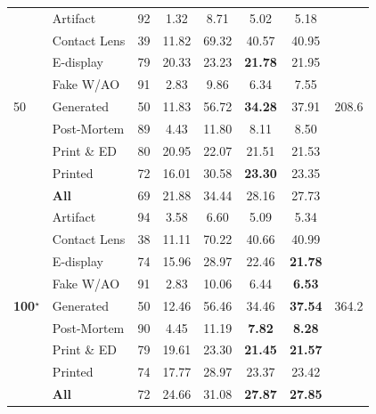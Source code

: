 \documentclass{article}
\newcommand{\B}[1]{\textbf{#1}}
\begin{document}
\begin{table}[!htbp]
\begin{tabular}{l l c c c c c c}
\multirow{9}{*}{50}
& Artifact          & 92 &   1.32 &  8.71 &           5.02 &  5.18 & \multirow{9}{*}{208.6} \\
& Contact Lens      & 39 &  11.82 & 69.32 &          40.57 & 40.95 & \\
& E-display         & 79 &  20.33 & 23.23 & \B{21.78} & 21.95 & \\
& Fake W/AO         & 91 &   2.83 &  9.86 &           6.34 &  7.55 & \\
& Generated         & 50 &  11.83 & 56.72 & \B{34.28} & 37.91 & \\
& Post-Mortem       & 89 &   4.43 & 11.80 &           8.11 &  8.50 & \\
& Print \& ED       & 80 &  20.95 & 22.07 &          21.51 & 21.53 & \\
& Printed           & 72 &  16.01 & 30.58 & \B{23.30} & 23.35 & \\
\cmidrule(lr){2-7}
& \textbf{All}      & 69 &  21.88 & 34.44 &          28.16 & 27.73 & \\
\midrule

\multirow{9}{*}{\textbf{100}$^{\star}$}
& Artifact          & 94 &   3.58 &  6.60 &           5.09 &  5.34 & \multirow{9}{*}{364.2} \\
& Contact Lens      & 38 &  11.11 & 70.22 &          40.66 & 40.99 & \\
& E-display         & 74 &  15.96 & 28.97 &          22.46 & \B{21.78} & \\
& Fake W/AO         & 91 &   2.83 & 10.06 &           6.44 &  \B{6.53} & \\
& Generated         & 50 &  12.46 & 56.46 &          34.46 & \B{37.54} & \\
& Post-Mortem       & 90 &   4.45 & 11.19 & \B{7.82}  &  \B{8.28} & \\
& Print \& ED       & 79 &  19.61 & 23.30 & \B{21.45} & \B{21.57} & \\
& Printed           & 74 &  17.77 & 28.97 &          23.37 & 23.42 & \\
\cmidrule(lr){2-7}
& \textbf{All}      & 72 &  24.66 & 31.08 & \B{27.87} & \B{27.85} & \\
\midrule


\end{tabular}
\end{table}
\end{document}
